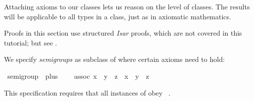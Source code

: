 %
\begin{isabellebody}%
\def\isabellecontext{Axioms}%
%
\isadelimtheory
%
\endisadelimtheory
%
\isatagtheory
%
\endisatagtheory
{\isafoldtheory}%
%
\isadelimtheory
%
\endisadelimtheory
%
\isamarkuptrue%
%
\begin{isamarkuptext}%
Attaching axioms to our classes lets us reason on the level of
classes.  The results will be applicable to all types in a class, just
as in axiomatic mathematics.

\begin{warn}
Proofs in this section use structured \emph{Isar} proofs, which are not
covered in this tutorial; but see \cite{Nipkow-TYPES02}.%
\end{warn}%
\end{isamarkuptext}%
\isamarkuptrue%
%
\isamarkuptrue%
%
\begin{isamarkuptext}%
We specify \emph{semigroups} as subclass of 
where certain axioms need to hold:%
\end{isamarkuptext}%
\isamarkuptrue%
\isamarkupfalse%
\ semigroup\ {\isacharequal}\ plus\ {\isacharplus}\isanewline
\ \ \ assoc{\isacharcolon}\ {\isachardoublequoteopen}{\isacharparenleft}x\ {\isasymoplus}\ y{\isacharparenright}\ {\isasymoplus}\ z\ {\isacharequal}\ x\ {\isasymoplus}\ {\isacharparenleft}y\ {\isasymoplus}\ z{\isacharparenright}{\isachardoublequoteclose}%
\begin{isamarkuptext}%
\noindent This \hyperlink{command.class}{\mbox{}} specification requires that
all instances of  obey \hyperlink{fact.assoc:}{\mbox{}}~.


\end{isamarkuptext}
\end{isabellebody}
